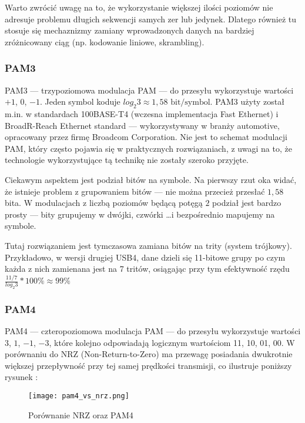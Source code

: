 Warto zwrócić uwagę na to, że wykorzystanie większej ilości poziomów nie adresuje problemu długich sekwencji samych zer lub jedynek. Dlatego również tu
stosuje się mechaznizmy zamiany wprowadzonych danych na bardziej zróżnicowany ciąg (np. kodowanie liniowe, skrambling).

\subsubsection{PAM3}

PAM3 --- trzypoziomowa modulacja PAM --- do przesyłu wykorzystuje wartości $+1$, $0$, $-1$. Jeden symbol koduje $log_{2}{3} \approx 1,58 \text{ bit/symbol}$.
PAM3 użyty został m.in. w standardach 100BASE-T4 (wczesna implementacja Fast Ethernet) i BroadR-Reach Ethernet standard --- wykorzystywany w branży automotive, opracowany przez firmę Broadcom Corporation.
Nie jest to schemat modulacji PAM, który często pojawia się w praktycznych rozwiązaniach, z uwagi na to, że technologie wykorzystujące tą technikę nie zostały szeroko przyjęte.

Ciekawym aspektem jest podział bitów na symbole. Na pierwszy rzut oka widać, że istnieje problem z grupowaniem bitów --- nie można przecież przesłać $1,58$ bita. W modulacjach z liczbą poziomów będącą potęgą $2$ podział jest bardzo prosty --- bity grupujemy w dwójki, czwórki \dots i bezpośrednio mapujemy na symbole.

Tutaj rozwiązaniem jest tymczasowa zamiana bitów na trity (system trójkowy). Przykładowo, w wersji drugiej USB4, dane dzieli się 11-bitowe grupy po czym każda z nich zamienana jest na 7 tritów, osiągając przy tym
efektywność rzędu $\frac{11/7}{log_{2}{3}} * 100\% \approx 99\% $


\subsubsection{PAM4}

PAM4 --- czteropoziomowa modulacja PAM --- do przesyłu wykorzystuje wartości $3$, $1$, $-1$, $-3$, które kolejno odpowiadają logicznym wartościom 11, 10, 01, 00. W porównaniu do NRZ (Non-Return-to-Zero) ma przewagę posiadania dwukrotnie większej przepływność przy tej samej prędkości transmisji, co ilustruje poniższy rysunek \cite{Intel-pam4}:

\begin{figure}[ht]
    \centering
    \texttt{[image: pam4\_vs\_nrz.png]}
    \caption{Porównanie NRZ oraz PAM4}
    \label{fig:pam4_vs_nrz}
\end{figure}

